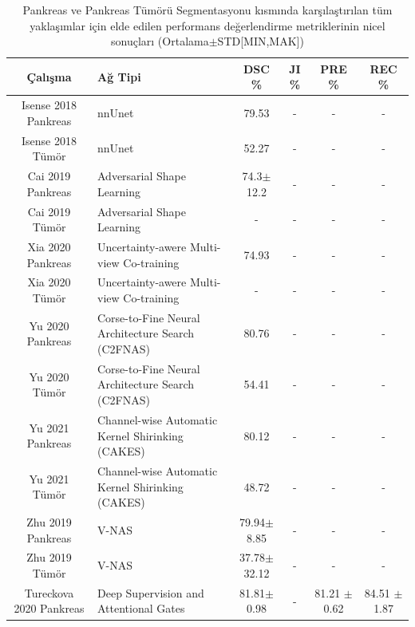 \begin{table}
	\centering
	\caption{Pankreas ve Pankreas Tümörü Segmentasyonu kısmında karşılaştırılan tüm yaklaşımlar için elde edilen performans değerlendirme metriklerinin nicel sonuçları (Ortalama$\pm$STD[MIN,MAK])}
	\label{tab:comp_panc2}
	\begin{adjustbox}{width=\textwidth}
		\begin{tabular}{cm{8cm}cccc}
			\toprule
			Çalışma   &    Ağ Tipi  & DSC \%  & JI \% &  PRE \% & REC \% \\ 
			\midrule 
			Isense 2018 \cite{isensee2018nnu}  Pankreas  &  nnUnet  & 79.53  &   -   &   -    & -   \\
			Isense 2018 \cite{isensee2018nnu}  Tümör  &  nnUnet  & 52.27  &   -   &   -    & -   \\ 	
			\toprule
			Cai 2019 \cite{cai2019end}  Pankreas  &  Adversarial Shape Learning  & 74.3$\pm$12.2  &   -   &   -    & -   \\
			Cai 2019 \cite{cai2019end}  Tümör  &  Adversarial Shape Learning  & -  &   -   &   -    & -   \\ 	
			\toprule
			Xia 2020 \cite{xia2020uncertainty}  Pankreas  &  Uncertainty-awere Multi-view Co-training  & 74.93  &   -   &   -    & -   \\
			Xia 2020 \cite{xia2020uncertainty}  Tümör  & Uncertainty-awere Multi-view Co-training  & -  &   -   &   -    & -   \\ 	
			\toprule
			Yu 2020 \cite{yu2020c2fnas}  Pankreas  &  Corse-to-Fine Neural Architecture Search (C2FNAS)  & 80.76  &   -   &   -    & -   \\
			Yu 2020 \cite{yu2020c2fnas}  Tümör  &  Corse-to-Fine Neural Architecture Search (C2FNAS)  & 54.41  &   -   &   -    & -   \\ 	
			\toprule
			Yu 2021 \cite{yu2020cakes}  Pankreas  &  Channel-wise Automatic Kernel Shirinking (CAKES)  & 80.12  &   -   &   -    & -   \\
			Yu 2021 \cite{yu2020cakes}  Tümör  &  Channel-wise Automatic Kernel Shirinking (CAKES)  & 48.72  &   -   &   -    & -   \\ 	
			\toprule
			Zhu 2019 \cite{zhu2019v}  Pankreas  &  V-NAS  & 79.94$\pm$8.85  &   -   &   -    & -   \\
			Zhu 2019 \cite{zhu2019v}  Tümör  &  V-NAS  & 37.78$\pm$32.12  &   -   &   -    & -   \\ 	
			\toprule
			Tureckova 2020 \cite{tureckova2020improving}  Pankreas  &  Deep Supervision and Attentional Gates  & 81.81$\pm$0.98  &   -   &   81.21 $\pm$ 0.62    &  84.51 $\pm$ 1.87   \\

\end{tabular}
\end{adjustbox}
\end{table}
